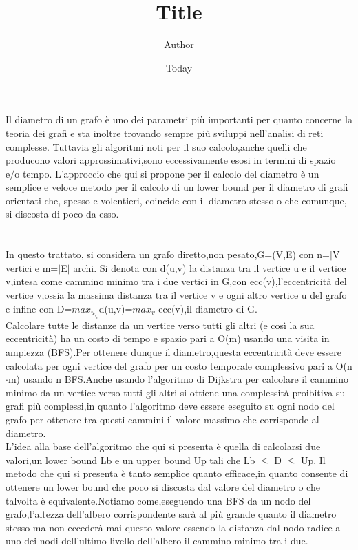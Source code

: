 \documentclass[]{article}
\begin{document}
\title{Title}
\author{Author}
\date{Today}

Il diametro di un grafo è uno dei parametri più importanti  per quanto concerne la teoria dei grafi e sta inoltre trovando sempre più sviluppi nell'analisi di reti complesse.
Tuttavia gli algoritmi noti per il suo calcolo,anche quelli che producono valori approssimativi,sono eccessivamente esosi in termini di spazio e/o tempo.
L'approccio che qui si propone per il calcolo del diametro è un semplice e veloce metodo per il calcolo di un lower bound per il diametro di grafi orientati che, spesso e volentieri, coincide con il diametro stesso o che comunque, si discosta di poco da esso.
\\
\\
\\

In questo trattato, si considera un grafo diretto,non pesato,G=(V,E) con n=$\mid $V$\mid $ vertici  e m=$\mid$E$\mid$ archi.
Si denota con d(u,v) la distanza tra il vertice u e il vertice v,intesa come cammino minimo tra i due vertici in G,con ecc(v),l'eccentricità del vertice v,ossia la massima distanza tra il vertice v e ogni altro vertice u del grafo e infine con D=$max_u_,_v  $d(u,v)=$max_v$ ecc(v),il diametro di G.\\
Calcolare tutte le distanze da un vertice verso tutti gli altri (e così la sua eccentricità) ha un costo di tempo e spazio pari a O(m) usando una visita in ampiezza (BFS).Per ottenere dunque il diametro,questa eccentricità deve essere calcolata per ogni vertice del grafo per un costo temporale complessivo pari a O(n$\cdot $m) usando n BFS.Anche usando l'algoritmo di Dijkstra per calcolare il cammino minimo da un vertice verso tutti gli altri si ottiene una complessità proibitiva su grafi più complessi,in quanto l'algoritmo deve essere eseguito su ogni nodo del grafo per ottenere tra questi cammini il valore massimo che corrisponde al diametro.\\
L'idea alla base dell'algoritmo che qui si presenta è quella di calcolarsi due valori,un lower bound Lb e un upper bound Up tali che Lb $\leq$ D $\leq $ Up.
Il metodo che qui si presenta è tanto semplice quanto efficace,in quanto consente di ottenere un lower bound che poco si discosta dal valore del diametro o che talvolta è equivalente.Notiamo come,eseguendo una BFS da un nodo del grafo,l'altezza dell'albero corrispondente sarà al più grande quanto il diametro stesso ma non eccederà mai questo valore essendo la distanza dal nodo radice a uno dei nodi dell'ultimo livello dell'albero il cammino minimo tra i due.
\end{document}
